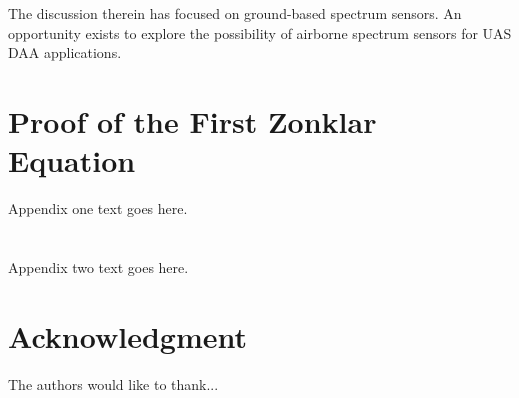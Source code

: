 \documentclass[journal,transmag]{IEEEtran}
\begin{document}
The discussion therein has focused on ground-based spectrum sensors. An opportunity exists to explore the possibility of airborne spectrum sensors for UAS DAA applications. 



%


\appendices
\section{Proof of the First Zonklar Equation}
Appendix one text goes here.

\section{}
Appendix two text goes here.


\section*{Acknowledgment}


The authors would like to thank...


\ifCLASSOPTIONcaptionsoff
  \newpage
\fi
\end{document}
